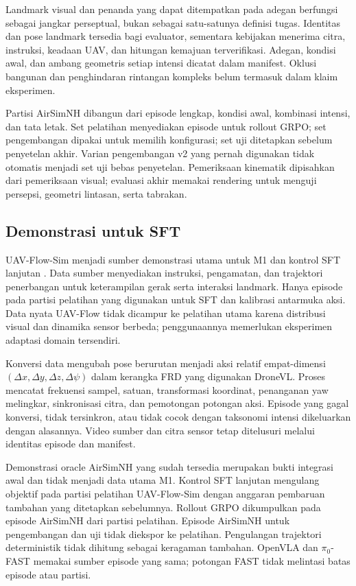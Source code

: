 Landmark visual dan penanda yang dapat ditempatkan pada adegan berfungsi sebagai jangkar perseptual, bukan sebagai satu-satunya definisi tugas. Identitas dan pose landmark tersedia bagi evaluator, sementara kebijakan menerima citra, instruksi, keadaan UAV, dan hitungan kemajuan terverifikasi. Adegan, kondisi awal, dan ambang geometris setiap intensi dicatat dalam manifest. Oklusi bangunan dan penghindaran rintangan kompleks belum termasuk dalam klaim eksperimen.

Partisi AirSimNH dibangun dari episode lengkap, kondisi awal, kombinasi intensi, dan tata letak. Set pelatihan menyediakan episode untuk rollout GRPO; set pengembangan dipakai untuk memilih konfigurasi; set uji ditetapkan sebelum penyetelan akhir. Varian pengembangan v2 yang pernah digunakan tidak otomatis menjadi set uji bebas penyetelan. Pemeriksaan kinematik dipisahkan dari pemeriksaan visual; evaluasi akhir memakai rendering untuk menguji persepsi, geometri lintasan, serta tabrakan.

\subsection{Demonstrasi untuk SFT}
\label{subsec:data_sft}
UAV-Flow-Sim menjadi sumber demonstrasi utama untuk M1 dan kontrol SFT lanjutan \citep{wang2025uavflow}. Data sumber menyediakan instruksi, pengamatan, dan trajektori penerbangan untuk keterampilan gerak serta interaksi landmark. Hanya episode pada partisi pelatihan yang digunakan untuk SFT dan kalibrasi antarmuka aksi. Data nyata UAV-Flow tidak dicampur ke pelatihan utama karena distribusi visual dan dinamika sensor berbeda; penggunaannya memerlukan eksperimen adaptasi domain tersendiri.

Konversi data mengubah pose berurutan menjadi aksi relatif empat-dimensi $(\Delta x,\Delta y,\Delta z,\Delta\psi)$ dalam kerangka FRD yang digunakan DroneVL. Proses mencatat frekuensi sampel, satuan, transformasi koordinat, penanganan yaw melingkar, sinkronisasi citra, dan pemotongan potongan aksi. Episode yang gagal konversi, tidak tersinkron, atau tidak cocok dengan taksonomi intensi dikeluarkan dengan alasannya. Video sumber dan citra sensor tetap ditelusuri melalui identitas episode dan manifest.

Demonstrasi oracle AirSimNH yang sudah tersedia merupakan bukti integrasi awal dan tidak menjadi data utama M1. Kontrol SFT lanjutan mengulang objektif pada partisi pelatihan UAV-Flow-Sim dengan anggaran pembaruan tambahan yang ditetapkan sebelumnya. Rollout GRPO dikumpulkan pada episode AirSimNH dari partisi pelatihan. Episode AirSimNH untuk pengembangan dan uji tidak diekspor ke pelatihan. Pengulangan trajektori deterministik tidak dihitung sebagai keragaman tambahan. OpenVLA dan $\pi_0$-FAST memakai sumber episode yang sama; potongan FAST tidak melintasi batas episode atau partisi.

